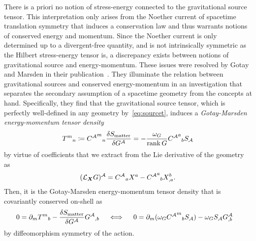 There is a priori no notion of stress-energy connected to the gravitational source tensor. This interpretation only arises from the Noether current of spacetime translation symmetry that induces a conservation law and thus warrants notions of conserved energy and momentum. Since the Noether current is only determined up to a divergent-free quantity, and is not intrinsically symmetric as the Hilbert stress-energy tensor is, a discrepancy exists between notions of gravitational source and energy-momentum. These issues were resolved by Gotay and Marsden in their publication~\autocite{GoMa1992}. They illuminate the relation between gravitational sources and conserved energy-momentum in an investigation that separates the secondary assumption of a spacetime geometry from the concepts at hand. Specifically, they find that the gravitational source tensor, which is perfectly well-defined in any geometry by~\eqref{eq:sourcet}, induces a \emph{Gotay-Marsden energy-momentum tensor density}
\begin{equation}\label{eq:gm_emt}
	{T^m}_n\coloneqq{{C^{\mathcal{A}}}^{m}}_{n}\frac{\delta S_\mathrm{matter}}{\delta G^{\mathcal{A}}}=-\frac{\omega_G}{\operatorname{rank}{G}}{{C^{\mathcal{A}}}^{a}}_{b}S_{\mathcal{A}}
\end{equation}
by virtue of coefficients that we extract from the Lie derivative of the geometry as
\begin{equation}\label{eq:GM_coeff}
	(\mathcal{L}_{\boldsymbol{X}} G)^{\mathcal{A}}={{C^{\mathcal{A}}}^{}}_{a} X^a-{{C^{\mathcal{A}}}^{a}}_{b} X^b_{,a}
	\mathpunct{.}
\end{equation}
Then, it is the Gotay-Marsden energy-momentum tensor density that is covariantly conserved on-shell as
\begin{align}\label{eq:em_cons}
	0=\partial_m{T^m}_b-\frac{\delta S_\mathrm{matter}}{\delta G^{\mathcal{A}}}{G^{\mathcal{A}}}_{,b} \quad
	\iff \quad 0&=\partial_m(\omega_G{{C^{\mathcal{A}}}^{m}}_{b}S_{\mathcal{A}})-\omega_GS_{\mathcal{A}}G^{\mathcal{A}}_{,b}
\end{align}
by diffeomorphism symmetry of the action.


